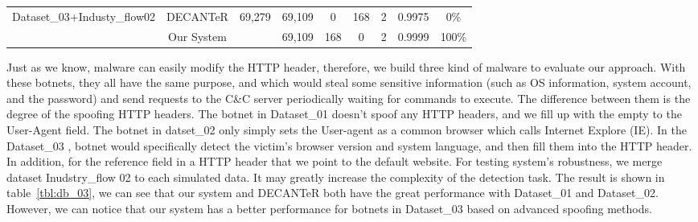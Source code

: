 \begin{table*}[!h]
\begin{tabular}{|c|c|c|c|c|c|c|c|c|}
\multirow{2}{*}{Dataset\_03+Industy\_flow02} & DECANTeR   \cite{bortolameotti2017decanter}              & \multirow{2}{*}{69,279}        & 69,109     & 0       & 168     & 2      & 0.9975                    & 0\%                                                                                               \\ \cline{2-2} \cline{4-9} 
                                             & Our System              &                                & 69,109     & 168     & 0       & 2      & 0.9999                    & 100\%                                                                                             \\ \hline\hline
\end{tabular}
\end{table*}



Just as we know, malware can easily modify the HTTP header, therefore, we build three kind of malware to evaluate our approach. With these botnets, they all have the same purpose, and which would steal some sensitive information (such as OS information, system account, and the password) and send requests to the C\&C server periodically waiting for commands to execute. The difference between them is the degree of the spoofing HTTP headers. The botnet in Dataset\_01 doesn't spoof any HTTP headers, and we fill up with the empty to the User-Agent field. The botnet in datset\_02 only simply sets the User-agent as a common browser which calls Internet Explore (IE). In the Dataset\_03 , botnet would specifically detect the victim's browser version and system language, and then fill them into the HTTP header. In addition, for the reference field in a HTTP header that we point to the default website. For testing system's robustness, we merge dataset Inudstry\_flow 02 to each simulated data. It may greatly increase the complexity of the detection task. The result is shown in table~\ref{tbl:db_03}, we can see that our system and DECANTeR \cite{bortolameotti2017decanter} both have the great performance with Dataset\_01 and Dataset\_02. However, we can notice that our system has a better performance for botnets in Dataset\_03 based on advanced spoofing methods.

